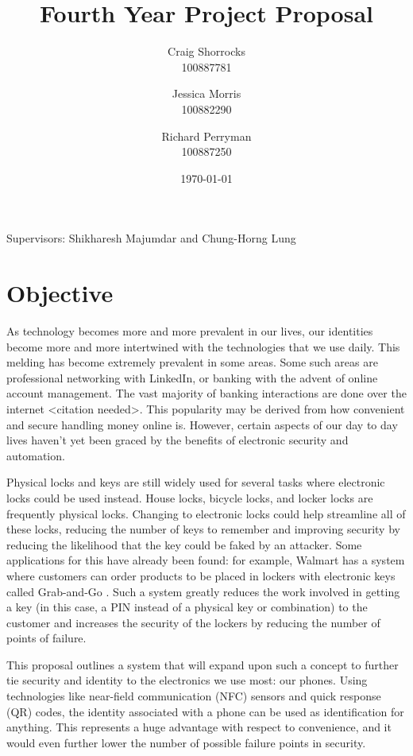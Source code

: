 \documentclass{article}
\title{Fourth Year Project Proposal}
\author{
	Craig Shorrocks \\
	100887781
	\and
	Jessica Morris \\
	100882290
	\and
	Richard Perryman \\
	100887250
}
\date{\today}
\begin{document}
\maketitle

\begin{center}
Supervisors: Shikharesh Majumdar and Chung-Horng Lung
\end{center}

\pagebreak

\tableofcontents

\pagebreak

\section{Objective}

As technology becomes more and more prevalent in our lives, our identities become more and more intertwined with the technologies that we use daily. This melding has become extremely prevalent in some areas. Some such areas are professional networking with LinkedIn, or banking with the advent of online account management. The vast majority of banking interactions are done over the internet \textless citation needed\textgreater. This popularity may be derived from how convenient and secure handling money online is. However, certain aspects of our day to day lives haven't yet been graced by the benefits of electronic security and automation.

Physical locks and keys are still widely used for several tasks where electronic locks could be used instead. House locks, bicycle locks, and locker locks are frequently physical locks. Changing to electronic locks could help streamline all of these locks, reducing the number of keys to remember and improving security by reducing the likelihood that the key could be faked by an attacker. Some applications for this have already been found: for example, Walmart has a system where customers can order products to be placed in lockers with electronic keys called Grab-and-Go \autocite{WALMART}. Such a system greatly reduces the work involved in getting a key (in this case, a PIN instead of a physical key or combination) to the customer and increases the security of the lockers by reducing the number of points of failure.

This proposal outlines a system that will expand upon such a concept to further tie security and identity to the electronics we use most: our phones. Using technologies like near-field communication (NFC) sensors and quick response (QR) codes, the identity associated with a phone can be used as identification for anything. This represents a huge advantage with respect to convenience, and it would even further lower the number of possible failure points in security.
\end{document}
